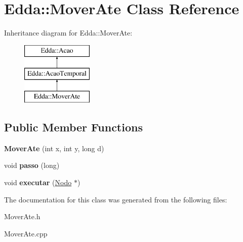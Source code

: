 \hypertarget{class_edda_1_1_mover_ate}{
\section{Edda::MoverAte Class Reference}
\label{class_edda_1_1_mover_ate}
}
Inheritance diagram for Edda::MoverAte:\begin{figure}[H]
\begin{center}
\leavevmode
\includegraphics[height=3.000000cm]{class_edda_1_1_mover_ate}
\end{center}
\end{figure}
\subsection*{Public Member Functions}
\begin{DoxyCompactItemize}
\item 
\hypertarget{class_edda_1_1_mover_ate_ae6a0c17d19a4e150d2256fcc49b7e47a}{
{\bfseries MoverAte} (int x, int y, long d)}
\label{class_edda_1_1_mover_ate_ae6a0c17d19a4e150d2256fcc49b7e47a}

\item 
\hypertarget{class_edda_1_1_mover_ate_a4a3f80857082e611b614874e8f03b6f0}{
void {\bfseries passo} (long)}
\label{class_edda_1_1_mover_ate_a4a3f80857082e611b614874e8f03b6f0}

\item 
\hypertarget{class_edda_1_1_mover_ate_a911667d2bb87327c148fbbbe97e5a633}{
void {\bfseries executar} (\hyperlink{class_edda_1_1_nodo}{Nodo} $\ast$)}
\label{class_edda_1_1_mover_ate_a911667d2bb87327c148fbbbe97e5a633}

\end{DoxyCompactItemize}


The documentation for this class was generated from the following files:\begin{DoxyCompactItemize}
\item 
MoverAte.h\item 
MoverAte.cpp\end{DoxyCompactItemize}
